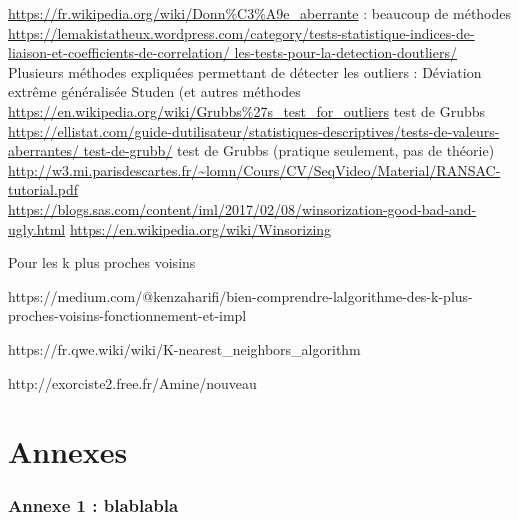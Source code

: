 \documentclass[a4paper,12pt]{article} %
\begin{document}
\url{https://fr.wikipedia.org/wiki/Donn\%C3\%A9e_aberrante} : beaucoup de méthodes \\
\url{https://lemakistatheux.wordpress.com/category/tests-statistique-indices-de-liaison-et-coefficients-de-correlation/ les-tests-pour-la-detection-doutliers/} Plusieurs méthodes expliquées permettant de détecter les outliers : Déviation extrême généralisée Studen (et autres méthodes \\
\url{ https://en.wikipedia.org/wiki/Grubbs\%27s_test_for_outliers} test de Grubbs \\
\url{https://ellistat.com/guide-dutilisateur/statistiques-descriptives/tests-de-valeurs-aberrantes/ test-de-grubb/} test de Grubbs (pratique seulement, pas de théorie)\\
\url{http://w3.mi.parisdescartes.fr/~lomn/Cours/CV/SeqVideo/Material/RANSAC-tutorial.pdf}\\
\url{https://blogs.sas.com/content/iml/2017/02/08/winsorization-good-bad-and-ugly.html}
\url{https://en.wikipedia.org/wiki/Winsorizing}

Pour les k plus proches voisins

https://medium.com/@kenzaharifi/bien-comprendre-lalgorithme-des-k-plus-proches-voisins-fonctionnement-et-impl%

https://fr.qwe.wiki/wiki/K-nearest_neighbors_algorithm

http://exorciste2.free.fr/Amine/nouveau%

\renewcommand\partname{}
\part{Annexes}
	\section*{Annexe 1 : blablabla}

\begin{figure}
\begin{center}
\end{center}
\end{figure}
\end{document}
